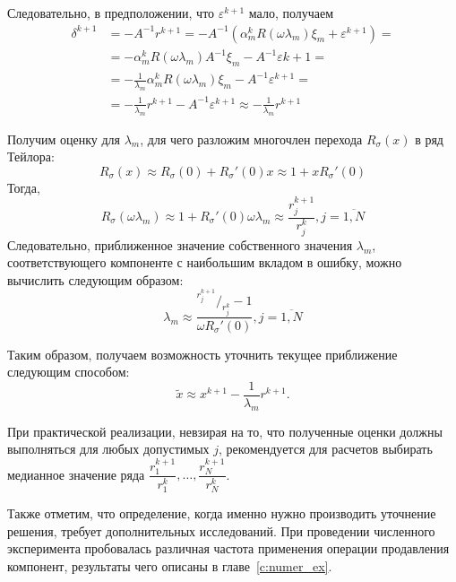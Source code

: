 \documentclass[a4paper,14pt]{extreport}
\begin{document}
Следовательно, в предположении, что $\varepsilon^{k+1}$ мало, получаем
	\begin{equation}
	\label{komp:many_eq2}	
		\begin{aligned}
		\delta^{k+1} &= -A^{-1}r^{k+1} = -A^{-1}(\alpha_m^kR(\omega\lambda_m)\xi_m + \varepsilon^{k+1}) = \\ &= -\alpha_m^k R(\omega \lambda_m)A^{-1}\xi_m -A^{-1}\varepsilon{k+1} = \\ &= -\frac{1}{\lambda_m} \alpha_m^kR(\omega \lambda_m)\xi_m - A^{-1}\varepsilon^{k+1} = \\ &= -\frac{1}{\lambda_m} r^{k+1} - A^{-1}\varepsilon^{k+1} \approx -\frac{1}{\lambda_m}r^{k+1}
		\end{aligned}
	\end{equation}

Получим оценку для $\lambda_m$, для чего разложим многочлен перехода $R_\sigma(x)$ в ряд Тейлора:
	\begin{equation}
	\label{komp:taylor1}	
	R_\sigma(x) \approx R_\sigma(0) + R_\sigma'(0)x \approx 1 + xR_\sigma'(0)
	\end{equation}
Тогда,
	\begin{equation}
	\label{komp:taylor2}	
	R_\sigma(\omega\lambda_m) \approx 1 + R_\sigma'(0)\omega\lambda_m \approx \frac{r_j^{k+1}}{r_j^k}, j=\overbar{1, N}
	\end{equation}
Следовательно, приближенное значение собственного значения $\lambda_m$, соответствующего компоненте с наибольшим вкладом в ошибку, можно вычислить следующим образом:
\begin{equation}
	\label{komp:lambda}	
	\lambda_m \approx \frac{ {}^{r_j^{k+1}}/_{r_j^k} - 1}{\omega R_\sigma'(0)}, j=\overbar{1, N}
	\end{equation}
	
Таким образом, получаем возможность уточнить текущее приближение следующим способом:
	\begin{equation}	
	\label{komp:opressioneq}	
	\widetilde{x} \approx x^{k+1} - \dfrac{1}{\lambda_m}r^{k+1}.
	\end{equation}

При практической реализации, невзирая на то, что полученные оценки должны выполняться для любых допустимых $j$, рекомендуется для расчетов выбирать медианное значение ряда $\dfrac{r_1^{k+1}}{r_1^k}, \ldots, \dfrac{r_N^{k+1}}{r_N^k}$.

Также отметим, что определение, когда именно нужно производить уточнение решения, требует дополнительных исследований. При проведении численного эксперимента пробовалась различная частота применения операции продавления компонент, результаты чего описаны в главе~\ref{c:numer_ex}.
  
\end{document}
